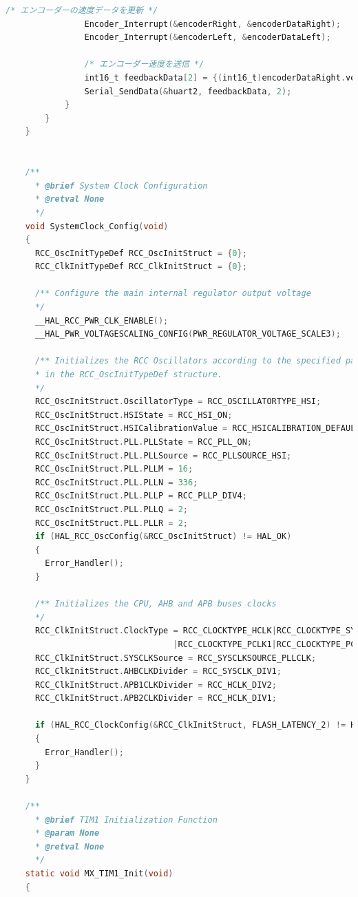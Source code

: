 \begin{lstlisting}[language=C, caption=メインコード(main.c)]
                /* エンコーダーの速度データを更新 */
                Encoder_Interrupt(&encoderRight, &encoderDataRight);
                Encoder_Interrupt(&encoderLeft, &encoderDataLeft);
    
                /* エンコーダー速度を送信 */
                int16_t feedbackData[2] = {(int16_t)encoderDataRight.velocity, -1*(int16_t)encoderDataLeft.velocity};
                Serial_SendData(&huart2, feedbackData, 2);
            }
        }
    }
    
    
    /**
      * @brief System Clock Configuration
      * @retval None
      */
    void SystemClock_Config(void)
    {
      RCC_OscInitTypeDef RCC_OscInitStruct = {0};
      RCC_ClkInitTypeDef RCC_ClkInitStruct = {0};
    
      /** Configure the main internal regulator output voltage
      */
      __HAL_RCC_PWR_CLK_ENABLE();
      __HAL_PWR_VOLTAGESCALING_CONFIG(PWR_REGULATOR_VOLTAGE_SCALE3);
    
      /** Initializes the RCC Oscillators according to the specified parameters
      * in the RCC_OscInitTypeDef structure.
      */
      RCC_OscInitStruct.OscillatorType = RCC_OSCILLATORTYPE_HSI;
      RCC_OscInitStruct.HSIState = RCC_HSI_ON;
      RCC_OscInitStruct.HSICalibrationValue = RCC_HSICALIBRATION_DEFAULT;
      RCC_OscInitStruct.PLL.PLLState = RCC_PLL_ON;
      RCC_OscInitStruct.PLL.PLLSource = RCC_PLLSOURCE_HSI;
      RCC_OscInitStruct.PLL.PLLM = 16;
      RCC_OscInitStruct.PLL.PLLN = 336;
      RCC_OscInitStruct.PLL.PLLP = RCC_PLLP_DIV4;
      RCC_OscInitStruct.PLL.PLLQ = 2;
      RCC_OscInitStruct.PLL.PLLR = 2;
      if (HAL_RCC_OscConfig(&RCC_OscInitStruct) != HAL_OK)
      {
        Error_Handler();
      }
    
      /** Initializes the CPU, AHB and APB buses clocks
      */
      RCC_ClkInitStruct.ClockType = RCC_CLOCKTYPE_HCLK|RCC_CLOCKTYPE_SYSCLK
                                  |RCC_CLOCKTYPE_PCLK1|RCC_CLOCKTYPE_PCLK2;
      RCC_ClkInitStruct.SYSCLKSource = RCC_SYSCLKSOURCE_PLLCLK;
      RCC_ClkInitStruct.AHBCLKDivider = RCC_SYSCLK_DIV1;
      RCC_ClkInitStruct.APB1CLKDivider = RCC_HCLK_DIV2;
      RCC_ClkInitStruct.APB2CLKDivider = RCC_HCLK_DIV1;
    
      if (HAL_RCC_ClockConfig(&RCC_ClkInitStruct, FLASH_LATENCY_2) != HAL_OK)
      {
        Error_Handler();
      }
    }
    
    /**
      * @brief TIM1 Initialization Function
      * @param None
      * @retval None
      */
    static void MX_TIM1_Init(void)
    {
    

\end{lstlisting}
